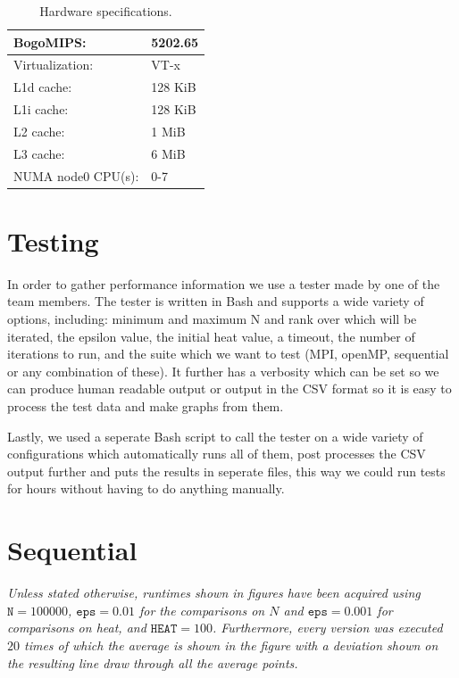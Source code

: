 \documentclass[a4paper]{article}
\begin{document}
\begin{table}[h]
\begin{tabular}{|l|l|}
        BogoMIPS:            &    5202.65\\\hline
        Virtualization:      &    VT-x\\\hline
        L1d cache:           &    128 KiB\\\hline
        L1i cache:           &    128 KiB\\\hline
        L2 cache:            &    1 MiB\\\hline
        L3 cache:            &    6 MiB\\\hline
        NUMA node0 CPU(s):   &    0-7\\
        \hline
    \end{tabular}
    \caption{Hardware specifications.}
    \label{tab: hardware}
\end{table}

\section{Testing}
In order to gather performance information we use a tester made by one of the team members. The tester is written in Bash and supports a wide variety of options, including: minimum and maximum N and rank over which will be iterated, the epsilon value, the initial heat value, a timeout, the number of iterations to run, and the suite which we want to test (MPI, openMP, sequential or any combination of these). It further has a verbosity which can be set so we can produce human readable output or output in the CSV format so it is easy to process the test data and make graphs from them.

Lastly, we used a seperate Bash script to call the tester on a wide variety of configurations which automatically runs all of them, post processes the CSV output further and puts the results in seperate files, this way we could run tests for hours without having to do anything manually.

\section{Sequential}
\textit{Unless stated otherwise, runtimes shown in figures have been acquired using $\texttt{N} = 100000$, $\texttt{eps} = 0.01$ for the comparisons on $N$ and $\texttt{eps} = 0.001$ for comparisons on heat, and $\texttt{HEAT} = 100$. Furthermore, every version was executed $20$ times of which the average is shown in the figure with a deviation shown on the resulting line draw through all the average points.}\\
\end{document}
